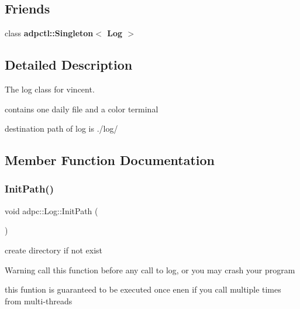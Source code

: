 \subsection*{Friends}
\begin{DoxyCompactItemize}
\item 
\mbox{\label{classadpc_1_1Log_a0e7b4c16064e3789d935b1b3523d78c7}} 
class {\bfseries adpctl\+::\+Singleton$<$ Log $>$}
\end{DoxyCompactItemize}


\subsection{Detailed Description}
The log class for vincent. 

contains one daily file and a color terminal

destination path of log is ./log/ 

\subsection{Member Function Documentation}
\mbox{\label{classadpc_1_1Log_a41b80ba97a00d128777d22f369bc791f}} 
\subsubsection{\texorpdfstring{Init\+Path()}{InitPath()}}
{\footnotesize\ttfamily void adpc\+::\+Log\+::\+Init\+Path (\begin{DoxyParamCaption}{ }\end{DoxyParamCaption})\hspace{0.3cm}{\ttfamily [static]}}



create directory if not exist 

\begin{DoxyWarning}{Warning}
call this function before any call to log, or you may crash your program
\end{DoxyWarning}
this funtion is guaranteed to be executed once enen if you call multiple times from multi-\/threads \mbox{\label{classadpc_1_1Log_a52882c51a9e3abd940164ded9a99b897}} 
